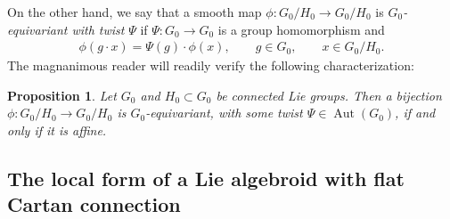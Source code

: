 \documentclass[11pt]{article}
\DeclareMathOperator{\automorphism}{Aut}
\numberwithin{equation}{section}
\newtheorem{PropositionBlaom}[TheoremBlaom]{Proposition}
 { \theoremstyle{definition}
\newtheorem{CounterexampleBlaom}[TheoremBlaom]{Counterexample}
\newtheorem{RemarkBlaom}[TheoremBlaom]{Remark} }
\begin{document}
On the other hand, we say that a smooth map $\phi \colon G_0/H_0
\rightarrow G_0/H_0$ is {\em $G_0$-equivariant with twist} $\Psi$ if
$\Psi \colon G_0 \rightarrow G_0$ is a group homomorphism and
  \begin{gather*}
    \phi(g \cdot  x)=\Psi(g) \cdot \phi(x), \qquad g \in G_0,\qquad x \in G_0/H_0.
  \end{gather*}
  The magnanimous reader will readily verify the following
  characterization:
  \begin{PropositionBlaom}\label{Proposition2.3}
  Let $G_0$ and $H_0 \subset G_0$ be connected Lie groups. Then a
  bijection $\phi \colon G_0/H_0 \rightarrow G_0/H_0$ is
  $G_0$-equivariant, with some twist $\Psi \in \automorphism(G_0)$, if
  and only if it is affine.
\end{PropositionBlaom}



\subsection{The local form of a Lie algebroid with f\/lat Cartan
  connection}\label{localform}
\end{document}
